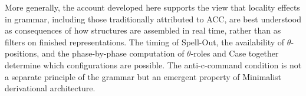 \documentclass[12pt]{article}
\begin{document}
More generally, the account developed here supports the view that locality effects in grammar, including those traditionally attributed to ACC, are best understood as consequences of how structures are assembled in real time, rather than as filters on finished representations. The timing of Spell-Out, the availability of $\theta$-positions, and the phase-by-phase computation of $\theta$-roles and Case together determine which configurations are possible. The anti-c-command condition is not a separate principle of the grammar but an emergent property of Minimalist derivational architecture.

\printbibliography
\end{document}

